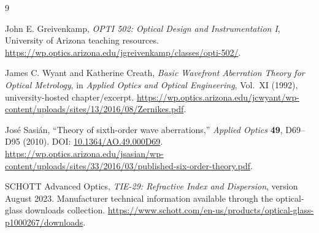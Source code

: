\begin{thebibliography}{9}
\raggedright
{}
John E. Greivenkamp, \emph{OPTI 502: Optical Design and Instrumentation I},
University of Arizona teaching resources.
\url{https://wp.optics.arizona.edu/jgreivenkamp/classes/opti-502/}.

James C. Wyant and Katherine Creath,
\emph{Basic Wavefront Aberration Theory for Optical Metrology},
in \emph{Applied Optics and Optical Engineering}, Vol.~XI (1992),
university-hosted chapter/excerpt.
\url{https://wp.optics.arizona.edu/jcwyant/wp-content/uploads/sites/13/2016/08/Zernikes.pdf}.

Jos\'e Sasi\'an, ``Theory of sixth-order wave aberrations,''
\emph{Applied Optics} \textbf{49}, D69--D95 (2010).
DOI: \href{https://doi.org/10.1364/AO.49.000D69}{10.1364/AO.49.000D69}.
\url{https://wp.optics.arizona.edu/jsasian/wp-content/uploads/sites/33/2016/03/published-six-order-theory.pdf}.

SCHOTT Advanced Optics, \emph{TIE-29: Refractive Index and Dispersion},
version August 2023. Manufacturer technical information available through
the optical-glass downloads collection.
\url{https://www.schott.com/en-us/products/optical-glass-p1000267/downloads}.
\end{thebibliography}
